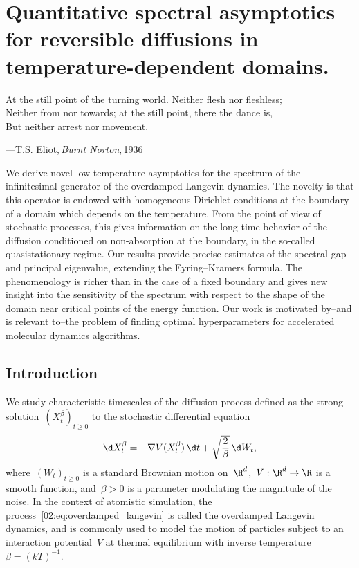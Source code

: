 \chapter{Quantitative spectral asymptotics for reversible diffusions in temperature-dependent domains.}
\label{02:chap:semiclassic}
    \epigraph{At the still point of the turning world. Neither flesh nor fleshless;\\
Neither from nor towards; at the still point, there the dance is,\\
But neither arrest nor movement.}{---T.S. Eliot,\,\textit{Burnt Norton},\,1936}
    \begin{chapterabstract}
    We derive novel low-temperature asymptotics for the spectrum of the infinitesimal generator of the overdamped Langevin dynamics. The novelty is that this operator is endowed with homogeneous Dirichlet conditions at the boundary of a domain which depends on the temperature. From the point of view of stochastic processes, this gives information on the long-time behavior of the diffusion conditioned on non-absorption at the boundary, in the so-called quasistationary regime. Our results provide precise estimates of the spectral gap and principal eigenvalue, extending the Eyring--Kramers formula. The phenomenology is richer than in the case of a fixed boundary and gives new insight into the sensitivity of the spectrum with respect to the shape of the domain near critical points of the energy function. Our work is motivated by--and is relevant to--the problem of finding optimal hyperparameters for accelerated molecular dynamics algorithms.
    \end{chapterabstract}

    \section{Introduction}
    \label{02:sec:intro}
    We study characteristic timescales of the diffusion process defined as the strong solution~$(X^{\beta}_t)_{t\geq 0}$ to the stochastic differential equation
    \begin{equation}
        \label{02:eq:overdamped_langevin}
        \d X^{\beta}_{t} = -\nabla V(X^{\beta}_{t})\,\d t + \sqrt{\frac2\beta}\, \d W_t,
    \end{equation}
    where~$(W_t)_{t\geq 0}$ is a standard Brownian motion on~$\R^d$,~$V:\R^d \to \R$ is a smooth function, and~$\beta>0$ is a parameter modulating the magnitude of the noise.
    In the context of atomistic simulation, the process~\eqref{02:eq:overdamped_langevin} is called the overdamped Langevin dynamics, and is commonly used to model the motion of particles subject to an interaction potential~$V$ at thermal equilibrium with inverse temperature~$\beta=(kT)^{-1}$.
    

